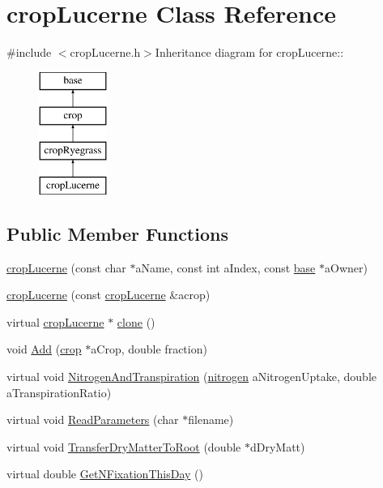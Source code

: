 \hypertarget{classcrop_lucerne}{
\section{cropLucerne Class Reference}
\label{classcrop_lucerne}
}


{\ttfamily \#include $<$cropLucerne.h$>$}Inheritance diagram for cropLucerne::\begin{figure}[H]
\begin{center}
\leavevmode
\includegraphics[height=4cm]{classcrop_lucerne}
\end{center}
\end{figure}
\subsection*{Public Member Functions}
\begin{DoxyCompactItemize}
\item 
\hyperlink{classcrop_lucerne_a18a128ff7c9bb7f4fefb9364e402bc34}{cropLucerne} (const char $\ast$aName, const int aIndex, const \hyperlink{classbase}{base} $\ast$aOwner)
\item 
\hyperlink{classcrop_lucerne_a755889d07d217abc7b5dc399640c84f1}{cropLucerne} (const \hyperlink{classcrop_lucerne}{cropLucerne} \&acrop)
\item 
virtual \hyperlink{classcrop_lucerne}{cropLucerne} $\ast$ \hyperlink{classcrop_lucerne_a5060448bb250b985ad156fb25b368daa}{clone} ()
\item 
void \hyperlink{classcrop_lucerne_afa12d3c07920dd3947636f3a7da8c4b4}{Add} (\hyperlink{classcrop}{crop} $\ast$aCrop, double fraction)
\item 
virtual void \hyperlink{classcrop_lucerne_a021d6c3c1d6951936e97d1a7e900331a}{NitrogenAndTranspiration} (\hyperlink{classnitrogen}{nitrogen} aNitrogenUptake, double aTranspirationRatio)
\item 
virtual void \hyperlink{classcrop_lucerne_a6eebd1599c5ae746d05fdae4c82c60fb}{ReadParameters} (char $\ast$filename)
\item 
virtual void \hyperlink{classcrop_lucerne_a6c87366e1282653cb964ca4c96ab8731}{TransferDryMatterToRoot} (double $\ast$dDryMatt)
\item 
virtual double \hyperlink{classcrop_lucerne_a427ff2efe93600382bfac05ec8b48365}{GetNFixationThisDay} ()
\end{DoxyCompactItemize}
